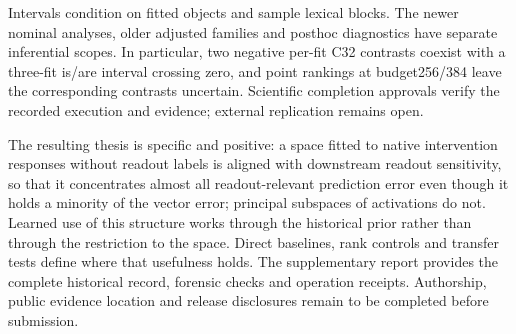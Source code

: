 \documentclass[11pt]{article}
\begin{document}
Intervals condition on fitted objects and sample lexical blocks. The newer nominal analyses, older adjusted families and posthoc diagnostics have separate inferential scopes. In particular, two negative per-fit C32 contrasts coexist with a three-fit is/are interval crossing zero, and point rankings at budget256/384 leave the corresponding contrasts uncertain. Scientific completion approvals verify the recorded execution and evidence; external replication remains open.

The resulting thesis is specific and positive: a space fitted to native intervention responses without readout labels is aligned with downstream readout sensitivity, so that it concentrates almost all readout-relevant prediction error even though it holds a minority of the vector error; principal subspaces of activations do not. Learned use of this structure works through the historical prior rather than through the restriction to the space. Direct baselines, rank controls and transfer tests define where that usefulness holds. The supplementary report provides the complete historical record, forensic checks and operation receipts. Authorship, public evidence location and release disclosures remain to be completed before submission.

\clearpage
\small


\end{document}
